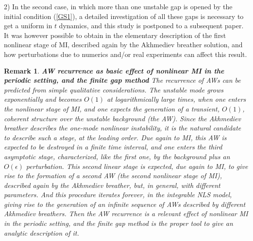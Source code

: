 \documentclass[12pt]{article}
\newtheorem{remark}{Remark}
\newcommand{\eps}{{\epsilon}}
\begin{document}
2) In the second case, in which more than one unstable gap is opened by the initial condition (\ref{GS1}), a detailed investigation of all these gaps is necessary to get a uniform in $t$ dynamics, and this study is postponed to a subsequent paper. It was however possible to obtain in \cite{GS1} the elementary description of the first nonlinear stage of MI, described again by the Akhmediev breather solution, and how perturbations due to numerics and/or real experiments can affect this result. 


\begin{remark}
{\bf AW recurrence as basic effect of nonlinear MI in the periodic setting, and the finite gap method} The recurrence of AWs can be predicted from simple qualitative considerations. The unstable mode grows exponentially and becomes $O(1)$ at logarithmically large times, when one enters the nonlinear stage of MI, and one expects the generation of a transient, $O(1)$, coherent structure over the unstable background (the AW). Since the Akhmediev breather describes the one-mode nonlinear instability, it is the natural candidate to describe such a stage, at the leading order. Due again to MI, this AW is expected to be destroyed in a finite time interval, and one enters the third asymptotic stage, characterized, like the first one, by the background plus an $O(\eps)$ perturbation. This second linear stage is expected, due again to MI, to give rise to the formation of a second AW (the second nonlinear stage of MI), described again by the Akhmediev breather, but, in general, with different parameters. And this procedure iterates forever, in the integrable NLS model, giving rise to the generation of an infinite sequence of AWs described by different Akhmediev breathers. {\it Then the AW recurrence is a relevant effect of nonlinear MI in the periodic setting, and the finite gap method is the proper tool to give an analytic description of it}. 
\end{remark}
\end{document}
